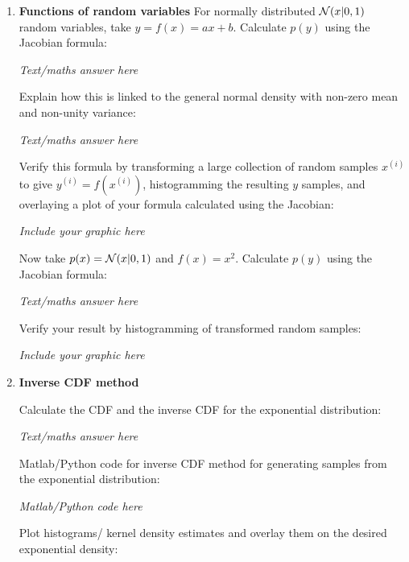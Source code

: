 \documentclass[12pt]{article}
\begin{document}
\begin{enumerate}
{\em Text/maths answer  here}
\vspace{3in}


\item {\bf Functions of random variables}
For normally distributed ${\cal N}(x|0,1)$ random variables, take $y=f(x)=ax+b$. Calculate $p(y)$ using the Jacobian formula:


{\em Text/maths answer  here}
\vspace{3in}


Explain how this is linked to the general normal density with non-zero mean and non-unity variance:


{\em Text/maths answer  here}
\vspace{3in}



 Verify this formula by transforming a large collection of random samples $x^{(i)}$ to give $y^{(i)}=f(x^{(i)})$, histogramming the resulting $y$ samples, and overlaying a plot of your formula calculated using the Jacobian:


{\em Include your graphic here}
\vspace{3in}




Now take $p(x)={\cal N}(x|0,1)$ and $f(x)=x^2$. Calculate $p(y)$ using the Jacobian formula:

{\em Text/maths answer  here}
\vspace{3in}




 Verify your result by histogramming of transformed random samples:


{\em Include your graphic here}
\vspace{3in}


\item{\bf Inverse CDF method} 



Calculate the CDF and the inverse CDF for the exponential distribution: 


{\em Text/maths answer  here}
\vspace{3in}



Matlab/Python code for inverse CDF method for generating samples from the exponential distribution:


{\em Matlab/Python code  here}
\vspace{3in}



Plot histograms/ kernel density estimates and overlay them on the desired exponential density:



\end{enumerate}
\end{document}
